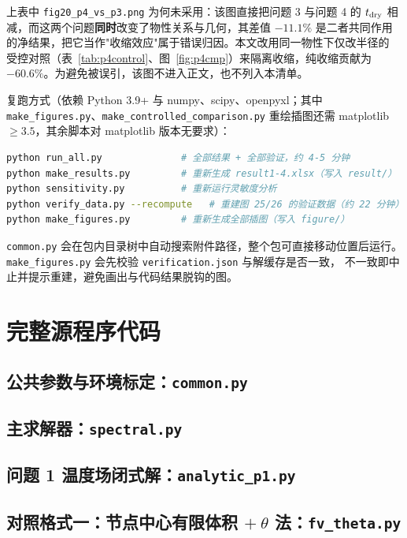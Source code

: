 \documentclass[withoutpreface,bwprint]{cumcmthesis}
\begin{document}
上表中 \texttt{fig20\_p4\_vs\_p3.png} 为何未采用：该图直接把问题 3 与问题 4 的
$t_{\rm dry}$ 相减，而这两个问题\textbf{同时}改变了物性关系与几何，其差值 $-11.1\%$
是二者共同作用的净结果，把它当作"收缩效应"属于错误归因。本文改用同一物性下仅改半径的
受控对照（表~\ref{tab:p4control}、图~\ref{fig:p4cmp}）来隔离收缩，纯收缩贡献为
$-60.6\%$。为避免被误引，该图不进入正文，也不列入本清单。

复跑方式（依赖 Python 3.9+ 与 numpy、scipy、openpyxl；其中
\texttt{make\_figures.py}、\texttt{make\_controlled\_comparison.py} 重绘插图还需
matplotlib $\ge 3.5$，其余脚本对 matplotlib 版本无要求）：
\begin{lstlisting}[language=bash]
python run_all.py              # 全部结果 + 全部验证，约 4-5 分钟
python make_results.py         # 重新生成 result1-4.xlsx（写入 result/）
python sensitivity.py          # 重新运行灵敏度分析
python verify_data.py --recompute   # 重建图 25/26 的验证数据（约 22 分钟）
python make_figures.py         # 重新生成全部插图（写入 figure/）
\end{lstlisting}
\texttt{common.py} 会在包内目录树中自动搜索附件路径，整个包可直接移动位置后运行。
\texttt{make\_figures.py} 会先校验 \texttt{verification.json} 与解缓存是否一致，
不一致即中止并提示重建，避免画出与代码结果脱钩的图。

\section{完整源程序代码}

\subsection{公共参数与环境标定：\texttt{common.py}}


\subsection{主求解器：\texttt{spectral.py}}


\subsection{问题 1 温度场闭式解：\texttt{analytic\_p1.py}}


\subsection{对照格式一：节点中心有限体积 $+\ \theta$ 法：\texttt{fv\_theta.py}}

\end{document}
